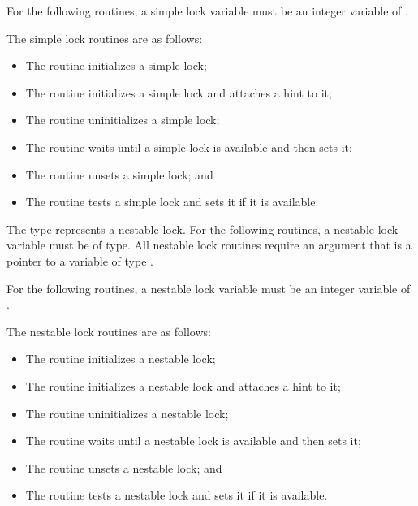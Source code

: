 \begin{fortranspecific}
For the following routines, a simple lock variable must be an integer 
variable of .
\end{fortranspecific}

The simple lock routines are as follows:

\begin{itemize}
\item The  routine initializes a simple lock;
\item The  routine initializes a simple 
      lock and attaches a hint to it;
\item The  routine uninitializes a simple lock;
\item The  routine waits until a simple lock is 
      available and then sets it;
\item The  routine unsets a simple lock; and
\item The  routine tests a simple lock and sets 
      it if it is available.
\end{itemize}

\begin{ccppspecific}
The type  represents a nestable lock. For the 
following routines, a nestable lock variable must be of 
 type. All nestable lock routines require an 
argument that is a pointer to a variable of type .
\end{ccppspecific}

\begin{fortranspecific}
For the following routines, a nestable lock variable must be an 
integer variable of .
\end{fortranspecific}

The nestable lock routines are as follows:

\begin{itemize}
\item The  routine initializes a nestable lock;
\item The  routine initializes a 
      nestable lock and attaches a hint to it;
\item The  routine uninitializes a nestable lock;
\item The  routine waits until a nestable lock 
      is available and then sets it;
\item The  routine unsets a nestable lock; and
\item The  routine tests a nestable lock and 
      sets it if it is available.
\end{itemize}

